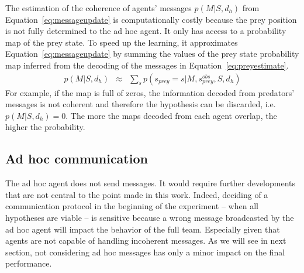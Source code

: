 The estimation of the coherence of agents' messages $p(M|S,d_h)$ from Equation~\ref{eq:messageupdate} is computationally costly because the prey position is not fully determined to the ad hoc agent. It only has access to a probability map of the prey state.
To speed up the learning, it approximates Equation~\ref{eq:messageupdate} by summing the values of the prey state probability map inferred from the decoding of the messages in Equation~\ref{eq:preyestimate}.
%
\begin{eqnarray}
p(M|S,d_h) &\approx& \sum_{s} p(s_{prey} = s|M, s^{obs}_{prey}, S, d_h)  \label{eq:approxmessupdate}
\end{eqnarray}
%
For example, if the map is full of zeros, the information decoded from predators' messages is not coherent and therefore the hypothesis can be discarded, i.e. $p(M|S,d_h) = 0$. The more the maps decoded from each agent overlap, the higher the probability.


\subsection{Ad hoc communication}

The ad hoc agent does not send messages. It would require further developments that are not central to the point made in this work. Indeed, deciding of a communication protocol in the beginning of the experiment -- when all hypotheses are viable -- is sensitive because a wrong message broadcasted by the ad hoc agent will impact the behavior of the full team. Especially given that agents are not capable of handling incoherent messages. As we will see in next section, not considering ad hoc messages has only a minor impact on the final performance.


